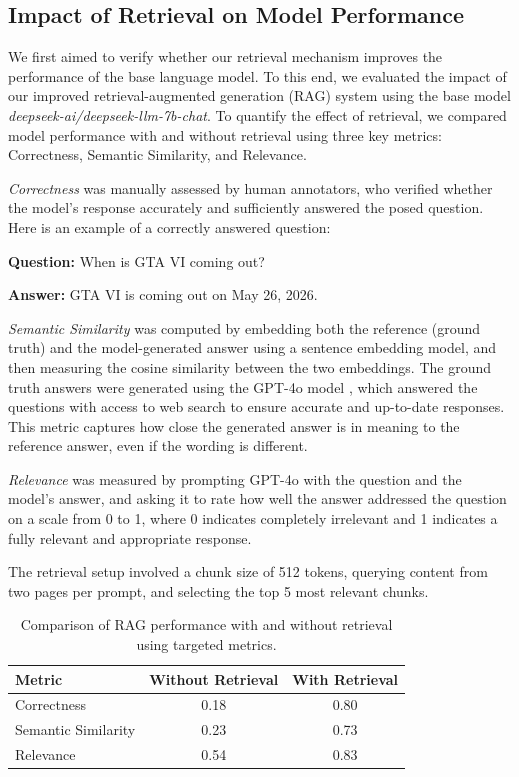 \documentclass[fleqn,moreauthors,10pt]{ds_report}
\begin{document}
\subsection*{Impact of Retrieval on Model Performance}
We first aimed to verify whether our retrieval mechanism improves the performance of the base language model. To this end, we evaluated the impact of our improved retrieval-augmented generation (RAG) system using the base model \textit{deepseek-ai/deepseek-llm-7b-chat}. To quantify the effect of retrieval, we compared model performance with and without retrieval using three key metrics: {Correctness}, {Semantic Similarity}, and {Relevance}.

\textit{Correctness} was manually assessed by human annotators, who verified whether the model's response accurately and sufficiently answered the posed question. Here is an example of a correctly answered question:

\begin{tcolorbox}[colback=gray!10!white, colframe=gray!80!black, boxrule=0.8pt, arc=3pt, left=3pt, right=3pt, top=3pt, bottom=3pt]
\textbf{Question:} When is GTA VI coming out?

\vspace{6pt}
\textbf{Answer:} GTA VI is coming out on May 26, 2026.
\end{tcolorbox}

\textit{Semantic Similarity} was computed by embedding both the reference (ground truth) and the model-generated answer using a sentence embedding model, and then measuring the cosine similarity between the two embeddings. The ground truth answers were generated using the GPT-4o model \cite{openai}, which answered the questions with access to web search to ensure accurate and up-to-date responses. This metric captures how close the generated answer is in meaning to the reference answer, even if the wording is different. 

\textit{Relevance} was measured by prompting GPT-4o with the question and the model's answer, and asking it to rate how well the answer addressed the question on a scale from 0 to 1, where 0 indicates completely irrelevant and 1 indicates a fully relevant and appropriate response.

The retrieval setup involved a chunk size of 512 tokens, querying content from two pages per prompt, and selecting the top 5 most relevant chunks.

\begin{table}[ht]
\caption{Comparison of RAG performance with and without retrieval using targeted metrics.}
\centering
\begin{tabular}{lcc}
\toprule
\textbf{Metric} & \textbf{Without Retrieval} & \textbf{With Retrieval} \\
\midrule
Correctness & 0.18 & 0.80 \\
Semantic Similarity & 0.23 & 0.73 \\
Relevance & 0.54 & 0.83 \\
\bottomrule
\end{tabular}
\label{tab:rag_core_metrics}
\end{table}
\end{document}
